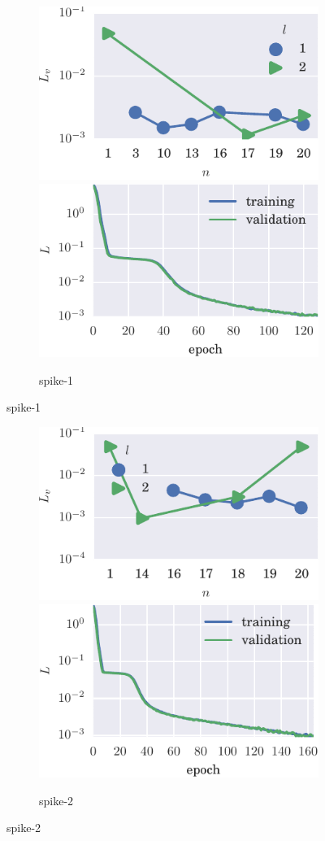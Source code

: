 \begin{figure}[!h]
    \centering %
  
  \begin{subfigure}[t]{\textwidth} %
        \includegraphics[width=.5\textwidth]{figs/bo_spikelv.pdf}
        \includegraphics[width=.5\textwidth]{figs/trn_spikelv.pdf}
        \caption{spike-1}
    \end{subfigure}%

\end{figure}
\begin{figure}[!hp]
\ContinuedFloat

  \begin{subfigure}[t]{\textwidth}
        \includegraphics[width=.5\textwidth]{figs/bo_spikereg.pdf}
        \includegraphics[width=.5\textwidth]{figs/trn_spikereg.pdf}
        \caption{spike-2}
    \end{subfigure}%

\end{figure}
